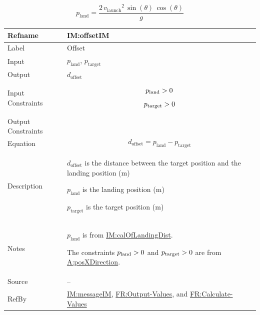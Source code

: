 \documentclass[12pt]{article}
\newcommand{\gt}{\ensuremath >}
\begin{document}
\begin{displaymath}
{p_{\text{land}}}=\frac{2\,{v_{\text{launch}}}^{2}\,\sin\left(θ\right)\,\cos\left(θ\right)}{g}
\end{displaymath}
\medskip
\noindent
\begin{minipage}{\textwidth}
\begin{tabular}{>{\raggedright}p{}>{\raggedright\arraybackslash}p{}}
\toprule \textbf{Refname} & \textbf{IM:offsetIM}
\label{IM:offsetIM}
\\ \midrule
Label & Offset
        
\\ \midrule
Input & ${p_{\text{land}}}$, ${p_{\text{target}}}$
        
\\ \midrule
Output & ${d_{\text{offset}}}$
         
\\ \midrule
Input Constraints & \begin{displaymath}
                    {p_{\text{land}}}\gt{}0
                    \end{displaymath}
                    \begin{displaymath}
                    {p_{\text{target}}}\gt{}0
                    \end{displaymath}
\\ \midrule
Output Constraints & 
\\ \midrule
Equation & \begin{displaymath}
           {d_{\text{offset}}}={p_{\text{land}}}-{p_{\text{target}}}
           \end{displaymath}
\\ \midrule
Description & \begin{symbDescription}
              \item{${d_{\text{offset}}}$ is the distance between the target position and the landing position (${\text{m}}$)}
              \item{${p_{\text{land}}}$ is the landing position (${\text{m}}$)}
              \item{${p_{\text{target}}}$ is the target position (${\text{m}}$)}
              \end{symbDescription}
\\ \midrule
Notes & ${p_{\text{land}}}$ is from \hyperref[IM:calOfLandingDist]{IM:calOfLandingDist}.
        
        The constraints ${p_{\text{land}}}\gt{}0$ and ${p_{\text{target}}}\gt{}0$ are from \hyperref[posXDirection]{A:posXDirection}.
        
\\ \midrule
Source & --
         
\\ \midrule
RefBy & \hyperref[IM:messageIM]{IM:messageIM}, \hyperref[outputValues]{FR:Output-Values}, and \hyperref[calcValues]{FR:Calculate-Values}
        
\\ \bottomrule
\end{tabular}
\end{minipage}
\end{document}
